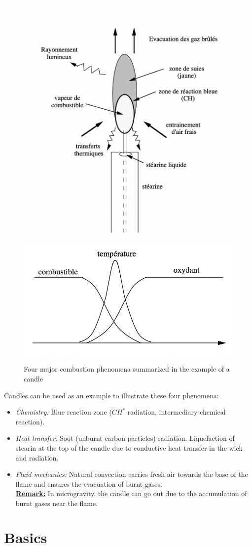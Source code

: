\documentclass[a4paper,11pt]{article}
\begin{document}
\begin{figure}[ht]
    \centering
    \includegraphics[width=.49\linewidth]{figures/Candle.png}
    \includegraphics[width=.49\linewidth]{figures/Reaction_Zone.png}
    \caption{Four major combustion phenomena summarized in the example of a candle}
\end{figure}

\pagebreak
Candles can be used as an example to illustrate these four phenomena:
\begin{itemize}
    \item \emph{Chemistry:} Blue reaction zone ($CH^*$ radiation, intermediary chemical reaction).
    \item \emph{Heat transfer:} Soot (unburnt carbon particles) radiation. Liquefaction of stearin at the top of the candle due to conductive heat transfer in the wick and radiation.
    \item \emph{Fluid mechanics:} Natural convection carries fresh air towards the base of the flame and ensures the evacuation of burnt gases.
    \vspace{4pt}
    \\
    \underline{\textbf{\small Remark:}} In microgravity, the candle can go out due to the accumulation of burnt gases near the flame.
\end{itemize}
\pagebreak
\section{Basics}
\end{document}
